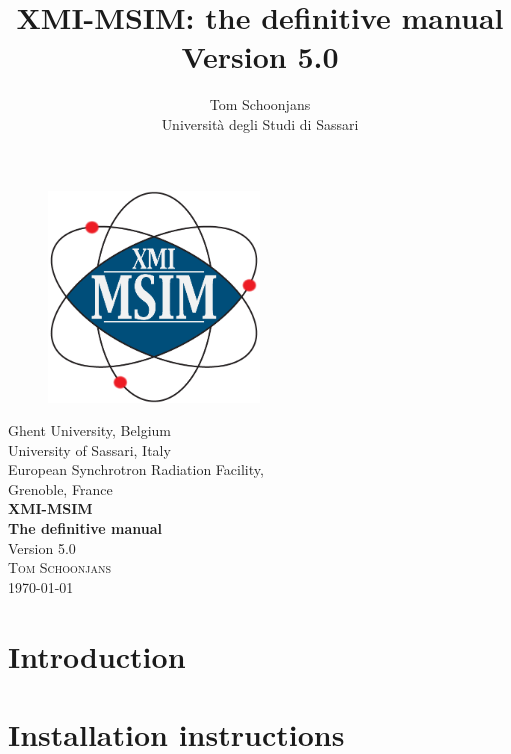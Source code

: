 \documentclass[11pt,a4paper,oneside,titlepage]{article}
\title{XMI-MSIM: the definitive manual\\\small{Version 5.0}}
\author{Tom Schoonjans\\Universit\`a degli Studi di Sassari}
\begin{document}
\begin{titlepage}
\begin{center}
\begin{figure}
\begin{center}
\includegraphics[width=0.5\textwidth]{Logo_xmi_msim.png}
\end{center}
\end{figure}
\vspace{1cm}
\Large{Ghent University, Belgium\\}
\vspace{0.7cm}
\Large{University of Sassari, Italy\\}
\vspace{0.7cm}
\Large{European Synchrotron Radiation Facility,\\Grenoble, France\\}
\vspace{1.5cm}
\Huge{\bfseries{XMI-MSIM\\}}
\vspace{1.5cm}
\huge{\bfseries{The definitive manual\\}}
\vspace{1.5cm}
\Large{Version 5.0\\}
\vspace{1.5cm}
\textsc{\large{Tom Schoonjans\\}}
\vfill
{\large \today}
\end{center}
\end{titlepage}


\tableofcontents
\newpage

\section{Introduction}\label{introduction}


\section{Installation instructions}\label{Installation-instructions}

\end{document}
